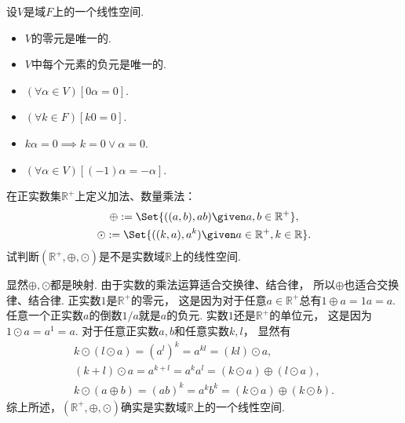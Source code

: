 \begin{property}
设\(V\)是域\(F\)上的一个线性空间.
\begin{itemize}
	\item \(V\)的零元是唯一的.
	\item \(V\)中每个元素的负元是唯一的.
	\item \((\forall\alpha\in V)[0\alpha=0]\).
	\item \((\forall k\in F)[k0=0]\).
	\item \(k\alpha=0 \implies k=0 \lor \alpha=0\).
	\item \((\forall\alpha\in V)[(-1)\alpha=-\alpha]\).
\end{itemize}
\end{property}

\begin{example}
在正实数集\(\mathbb{R}^+\)上定义加法、数量乘法：\begin{gather*}
	\oplus \defeq \Set{
		((a,b),ab)
		\given
		a,b \in \mathbb{R}^+
	}, \\
	\odot \defeq \Set{
		((k,a),a^k)
		\given
		a \in \mathbb{R}^+,
		k \in \mathbb{R}
	}.
\end{gather*}
试判断\((\mathbb{R}^+,\oplus,\odot)\)是不是实数域\(\mathbb{R}\)上的线性空间.
\begin{solution}
显然\(\oplus,\odot\)都是映射.
由于实数的乘法运算适合交换律、结合律，
所以\(\oplus\)也适合交换律、结合律.
正实数\(1\)是\(\mathbb{R}^+\)的零元，
这是因为对于任意\(a \in \mathbb{R}^+\)总有\(1 \oplus a = 1a = a\).
任意一个正实数\(a\)的倒数\(1/a\)就是\(a\)的负元.
实数\(1\)还是\(\mathbb{R}^+\)的单位元，
这是因为\(1 \odot a = a^1 = a\).
对于任意正实数\(a,b\)和任意实数\(k,l\)，
显然有\begin{gather*}
	k \odot (l \odot a)
	= (a^l)^k
	= a^{k l}
	= (kl) \odot a, \\
	(k+l) \odot a
	= a^{k+l}
	= a^k a^l
	= (k \odot a) \oplus (l \odot a), \\
	k \odot (a \oplus b)
	= (ab)^k
	= a^k b^k
	= (k \odot a) \oplus (k \odot b).
\end{gather*}
综上所述，\((\mathbb{R}^+,\oplus,\odot)\)确实是实数域\(\mathbb{R}\)上的一个线性空间.
\end{solution}
\end{example}

